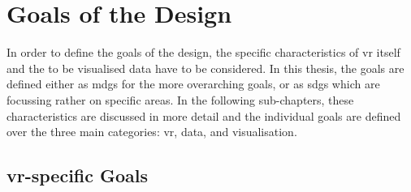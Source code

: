 \section{Goals of the Design}

In order to define the goals of the design, the specific characteristics of \gls{vr} itself and the to be visualised data have to be considered. In this thesis, the goals are defined either as \glspl{mdg} for the more overarching goals, or as \glspl{sdg} which are focussing rather on specific areas. In the following sub-chapters, these characteristics are discussed in more detail and the individual goals are defined over the three main categories: \gls{vr}, data, and visualisation.

\subsection{\gls{vr}-specific Goals}

